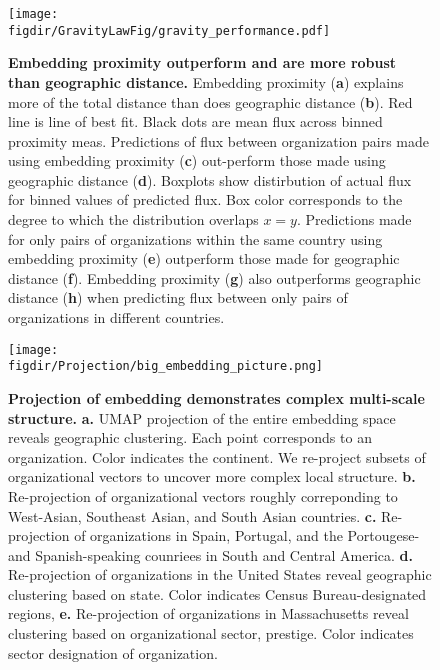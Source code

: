 \documentclass[12pt]{article} %
\def\figdir{../Figs}
\begin{document}
%
%
\begin{figure}[h!]
	\centering
	\label{fig:gravity_performance}
	\texttt{[image: \\figdir/GravityLawFig/gravity\_performance.pdf]}
	\caption{
		\textbf{Embedding proximity outperform and are more robust than geographic distance.}
		Embedding proximity (\textbf{a}) explains more of the total distance than does geographic distance (\textbf{b}). 
		Red line is line of best fit. 
		Black dots are mean flux across binned proximity meas.
		Predictions  of flux between organization pairs made using embedding proximity (\textbf{c}) out-perform those made using geographic distance (\textbf{d}). 
		Boxplots show distirbution of actual flux for binned values of predicted flux.
		Box color corresponds to the degree to which the distribution overlaps $x = y$.
		Predictions made for only pairs of organizations within the same country using embedding proximity (\textbf{e}) outperform those made for geographic distance (\textbf{f}).
		Embedding proximity (\textbf{g}) also outperforms geographic distance (\textbf{h}) when predicting flux between only pairs of organizations in different countries. 
	}
\end{figure}



%
%
\begin{figure}[hp!]
	\centering
	\label{fig:projection}
	\texttt{[image: \\figdir/Projection/big\_embedding\_picture.png]}
	\caption{
		\textbf{Projection of embedding demonstrates complex multi-scale structure.}
		\textbf{a.}
		UMAP projection of the entire embedding space reveals geographic clustering.
		Each point corresponds to an organization.
		Color indicates the continent. 
		We re-project subsets of organizational vectors to uncover more complex local structure.
		\textbf{b.} Re-projection of organizational vectors roughly correponding to West-Asian, Southeast Asian, and South Asian countries. 
		\textbf{c.} Re-projection of organizations in Spain, Portugal, and the Portougese- and Spanish-speaking counriees in South and Central America. 
		\textbf{d.} Re-projection of organizations in the United States reveal geographic clustering based on state.
		Color indicates Census Bureau-designated regions,
		\textbf{e.} Re-projection of organizations in Massachusetts reveal clustering based on organizational sector, prestige. 
		Color indicates sector designation of organization. 
	}
\end{figure}
\end{document}
